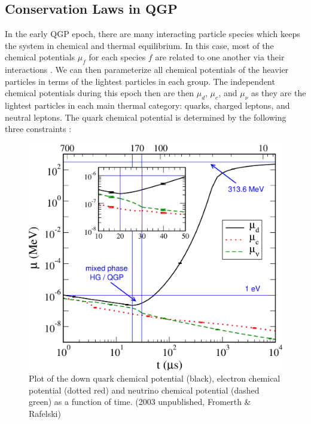 \documentclass[universe,article,submit,moreauthors,pdftex,a4paper]{Definitions/mdpi}
\begin{document}
\subsection{Conservation Laws in QGP}\label{sec:Conservation}
\noindent In the early QGP epoch, there are many interacting particle species which keeps the system in chemical and thermal equilibrium. In this case, most of the chemical potentials $\mu_f$ for each species $f$ are related to one another via their interactions \cite{Fromerth:2012fe}. We can then parameterize all chemical potentials of the heavier particles in terms of the lightest particles in each group. The independent chemical potentials during this epoch then are then $\mu_d$, $\mu_e$, and $\mu_\nu$ as they are the lightest particles in each main thermal category: quarks, charged leptons, and neutral leptons. The quark chemical potential is determined by the following three constraints \cite{Fromerth:2012fe}:
\begin{figure}[h]
  \centering
  \includegraphics[width=\linewidth]{./extra/muCombo.pdf}
  \caption{Plot of the down quark chemical potential (black), electron chemical potential (dotted red) and neutrino chemical potential (dashed green) as a function of time. (2003 unpublished, Fromerth \& Rafelski) \cite{Rafelski:2019twp}}
  \label{QGPchem1} 
\end{figure}
\end{document}
